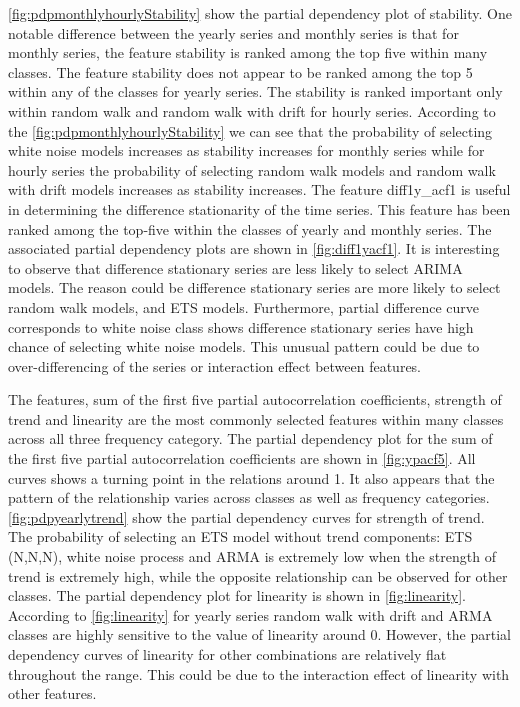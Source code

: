 \documentclass[11pt,a4paper,]{article}
\begin{document}
\autoref{fig:pdpmonthlyhourlyStability} show the partial dependency plot of stability. One notable difference between the yearly series and monthly series is that for monthly series, the feature stability is ranked among the top five within many classes. The feature stability does not appear to be ranked among the top 5 within any of the classes for yearly series. The stability is ranked important only within random walk and random walk with drift for hourly series. According to the \autoref{fig:pdpmonthlyhourlyStability} we can see that the probability of selecting white noise models increases as stability increases for monthly series while for hourly series the probability of selecting random walk models and random walk with drift models increases as stability increases. The feature diff1y\_acf1 is useful in determining the difference stationarity of the time series. This feature has been ranked among the top-five within the classes of yearly and monthly series. The associated partial dependency plots are shown in \autoref{fig:diff1yacf1}. It is interesting to observe that difference stationary series are less likely to select ARIMA models. The reason could be difference stationary series are more likely to select random walk models, and ETS models. Furthermore, partial difference curve corresponds to white noise class shows difference stationary series have high chance of selecting white noise models. This unusual pattern could be due to over-differencing of the series or interaction effect between features.

The features, sum of the first five partial autocorrelation coefficients, strength of trend and linearity are the most commonly selected features within many classes across all three frequency category. The partial dependency plot for the sum of the first five partial autocorrelation coefficients are shown in \autoref{fig:ypacf5}. All curves shows a turning point in the relations around 1. It also appears that the pattern of the relationship varies across classes as well as frequency categories. \autoref{fig:pdpyearlytrend} show the partial dependency curves for strength of trend. The probability of selecting an ETS model without trend components: ETS (N,N,N), white noise process and ARMA is extremely low when the strength of trend is extremely high, while the opposite relationship can be observed for other classes. The partial dependency plot for linearity is shown in \autoref{fig:linearity}. According to \autoref{fig:linearity} for yearly series random walk with drift and ARMA classes are highly sensitive to the value of linearity around 0. However, the partial dependency curves of linearity for other combinations are relatively flat throughout the range. This could be due to the interaction effect of linearity with other features.
\end{document}
